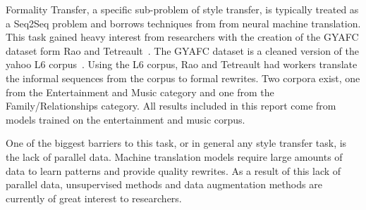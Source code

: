 \documentclass[12pt]{article}
\begin{document}
Formality Transfer, a specific sub-problem of style transfer, 
is typically treated as a Seq2Seq problem and borrows techniques from 
from neural machine translation. This task gained heavy interest from researchers 
with the creation of the GYAFC dataset form Rao and Tetreault~\cite{rao2018dear}.
The GYAFC dataset is a cleaned version of the yahoo L6 corpus~\cite{yahooaaa}. 
Using the L6 corpus, Rao and Tetreault had workers translate the informal sequences 
from the corpus to formal rewrites. Two corpora exist, one from the Entertainment and Music category 
and one from the Family/Relationships category. All results included in this report come from
models trained on the 
entertainment and music corpus.  

\par One of the biggest barriers to this task, or in general any 
style transfer task, is the lack of parallel data. Machine translation models require large amounts
of data to learn patterns and provide quality rewrites. As a result of this lack of parallel data,
unsupervised methods 
and data augmentation methods are currently of great interest to researchers. 
\end{document}
